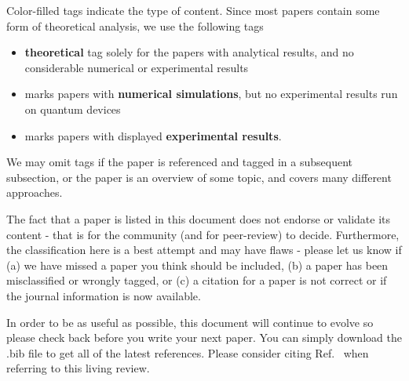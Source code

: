 \documentclass[12pt,letterpaper]{article}
\begin{document}
 Color-filled tags indicate the type of content. Since most papers contain some form of theoretical analysis, we use the following tags

\begin{itemize}
    \item {} \textbf{theoretical} tag solely for the papers with analytical results, and no considerable numerical or experimental results
    \item  {} marks papers with \textbf{numerical simulations}, but no experimental results run on quantum devices
    \item {} marks papers with displayed \textbf{experimental results}.
\end{itemize}
We may omit tags if the paper is referenced and tagged in a subsequent subsection, or the paper is an overview of some topic, and covers many different approaches.

The fact that a paper is listed in this document does not endorse or validate its content - that is for the community (and for peer-review) to decide.  Furthermore, the classification here is a best attempt and may have flaws - please let us know if (a) we have missed a paper you think should be included, (b) a paper has been misclassified or wrongly tagged, or (c) a citation for a paper is not correct or if the journal information is now available.

In order to be as useful as possible, this document will continue to evolve so please check back 
before you write your next paper. You can simply download the .bib file to get all of the latest references. Please consider citing Ref.~\cite{qppqlivingreview} when referring to this living review.
\end{document}
